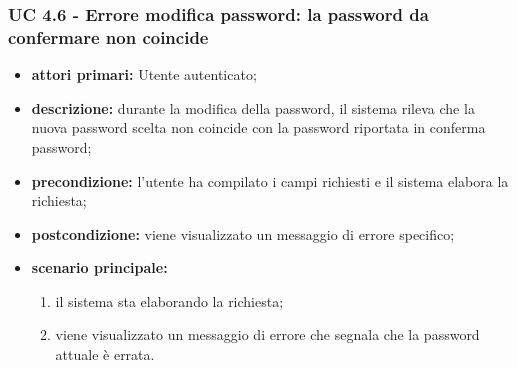 			\subsubsection{UC 4.6 - Errore modifica password: la password da confermare non coincide}
			\begin{itemize}
				\item \textbf{attori primari:} Utente autenticato;
				\item \textbf{descrizione:} durante la modifica della password, il sistema rileva che la nuova password scelta non coincide con la password riportata in conferma password;
				\item \textbf{precondizione:} l'utente ha compilato i campi richiesti e il sistema elabora la richiesta;
				\item \textbf{postcondizione:} viene visualizzato un messaggio di errore specifico;
				\item \textbf{scenario principale:}
				\begin{enumerate}
					\item il sistema sta elaborando la richiesta;
					\item viene visualizzato un messaggio di errore che segnala che la password attuale è errata.
				\end{enumerate}
			\end{itemize}
			
